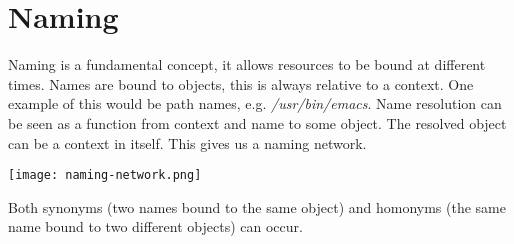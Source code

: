 \section{Naming}

Naming is a fundamental concept, it allows resources to be bound at different times. Names are bound to objects, this is always relative to a context. One example of this would be path names, e.g. \textit{/usr/bin/emacs}. Name resolution can be seen as a function from context and name to some object. The resolved object can be a context in itself. This gives us a naming network.
\begin{center}
	\texttt{[image: naming-network.png]}
\end{center}

Both synonyms (two names bound to the same object) and homonyms (the same name bound to two different objects) can occur.